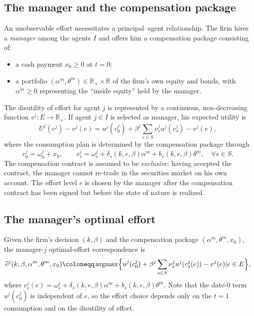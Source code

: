 \documentclass[11pt,a4paper,oneside]{book}
\def\R{\mathbb{R}}
\def\geq{\geqslant}
\DeclareMathOperator*{\argmax}{argmax}
\theoremstyle{plain}
\theoremstyle{definition}
\theoremstyle{remark}
\numberwithin{equation}{chapter}
\begin{document}
\subsection{The manager and the compensation package}

An unobservable effort necessitates a principal--agent relationship.
The firm hires a \emph{manager} among the agents $I$ and offers him a compensation package consisting of:
\begin{itemize}
  \item a cash payment $x_0 \geq 0$ at $t=0$;
  \item a portfolio $(\alpha^m, \theta^m) \in \R_+ \times \R$ of the firm's own equity and bonds, with $\alpha^m \geq 0$ representing the ``inside equity'' held by the manager.
\end{itemize}
The disutility of effort for agent $j$ is represented by a continuous, non-decreasing function $v^j : E \to \R_+$.
If agent $j \in I$ is selected as manager, his expected utility is
\begin{equation}\label{eq:manager-utility}
  U^j(c^j) - v^j(e) = u^j(c^j_0) + \beta^j \sum_{s \in S} \nu^j_s u^j(c^j_s) - v^j(e),
\end{equation}
where the consumption plan is determined by the compensation package through
\begin{equation}\label{eq:manager-consumption}
  c^j_0 = \omega^j_0 + x_0,
  \qquad
  c^j_s = \omega^j_s + \delta_s(k, e, \beta) \alpha^m + b_s(k, e, \beta) \theta^m, \quad \forall s \in S.
\end{equation}
The compensation contract is assumed to be \emph{exclusive}: having accepted the contract, the manager cannot re-trade in the securities market on his own account.
The effort level $e$ is chosen by the manager after the compensation contract has been signed but before the state of nature is realized.

\subsection{The manager's optimal effort}

Given the firm's decision $(k, \beta)$ and the compensation package $(\alpha^m, \theta^m, x_0)$, the manager-$j$ optimal-effort correspondence is
\begin{equation}\label{eq:opt-effort-MH-CPP}
  \widetilde{e}^j(k, \beta, \alpha^m, \theta^m, x_0)
  \coloneqq \argmax \Bigl\{ u^j(c^j_0) + \beta^j \sum_{s \in S} \nu^j_s u^j(c^j_s(e)) - v^j(e) \vert e \in E \Bigr\},
\end{equation}
where $c^j_s(e) = \omega^j_s + \delta_s(k, e, \beta) \alpha^m + b_s(k, e, \beta) \theta^m$.
Note that the date-$0$ term $u^j(c^j_0)$ is independent of $e$, so the effort choice depends only on the $t=1$ consumption and on the disutility of effort.
\end{document}
